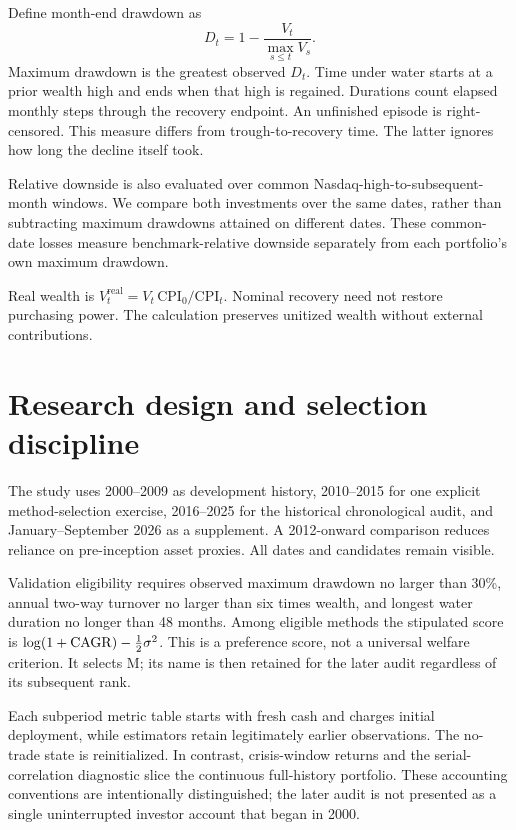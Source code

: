 \documentclass[12pt,letterpaper]{article}
\begin{document}
Define month-end drawdown as
\begin{equation}
D_t=1-\frac{V_t}{\max_{s\le t}V_s}.
\end{equation}
Maximum drawdown is the greatest observed $D_t$. Time under water starts at a prior wealth high and ends when that high is regained. Durations count elapsed monthly steps through the recovery endpoint. An unfinished episode is right-censored. This measure differs from trough-to-recovery time. The latter ignores how long the decline itself took.

Relative downside is also evaluated over common Nasdaq-high-to-subsequent-month windows. We compare both investments over the same dates, rather than subtracting maximum drawdowns attained on different dates. These common-date losses measure benchmark-relative downside separately from each portfolio's own maximum drawdown.

Real wealth is $V_t^{\mathrm{real}}=V_t\,\mathrm{CPI}_0/\mathrm{CPI}_t$. Nominal recovery need not restore purchasing power. The calculation preserves unitized wealth without external contributions.

\section{Research design and selection discipline}
The study uses 2000--2009 as development history, 2010--2015 for one explicit method-selection exercise, 2016--2025 for the historical chronological audit, and January--September 2026 as a supplement. A 2012-onward comparison reduces reliance on pre-inception asset proxies. All dates and candidates remain visible.

Validation eligibility requires observed maximum drawdown no larger than 30\%, annual two-way turnover no larger than six times wealth, and longest water duration no longer than 48 months. Among eligible methods the stipulated score is $\log(1+\operatorname{CAGR})-\tfrac12\sigma^2$. This is a preference score, not a universal welfare criterion. It selects M; its name is then retained for the later audit regardless of its subsequent rank.

Each subperiod metric table starts with fresh cash and charges initial deployment, while estimators retain legitimately earlier observations. The no-trade state is reinitialized. In contrast, crisis-window returns and the serial-correlation diagnostic slice the continuous full-history portfolio. These accounting conventions are intentionally distinguished; the later audit is not presented as a single uninterrupted investor account that began in 2000.
\end{document}
